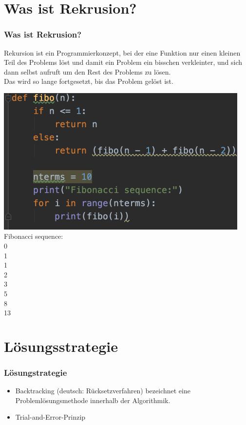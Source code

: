 \documentclass{beamer}
\begin{document}
\section{Was ist Rekrusion?}
\begin{frame}
	\frametitle{Was ist Rekrusion?} 
	\begin{minipage}{0.48\textwidth}
		Rekursion ist ein Programmierkonzept, bei der eine Funktion nur einen kleinen Teil des Problems löst und damit ein Problem ein bisschen verkleinter, und sich dann selbst aufruft um den Rest des Problems zu lösen.\\
		
		Das wird so lange fortgesetzt, bis das Problem gelöst ist.
		
	\end{minipage}
	\begin{minipage}{0.48\textwidth}
	\centering
	\includegraphics[width=0.95\textwidth]{img/fibo.png}
	\flushleft
	Fibonacci sequence:\\
	0\\
	1\\
	1\\
	2\\
	3\\
	5\\
	8\\
	13\\
	\end{minipage}
\end{frame}

\section{Lösungsstrategie}
\begin{frame}
	\frametitle{Lösungstrategie} 
	\begin{itemize}
		\item Backtracking (deutsch: Rücksetzverfahren) bezeichnet eine Problemlösungsmethode innerhalb der Algorithmik. 
		\item Trial-and-Error-Prinzip
	\end{itemize}
\end{frame}
\end{document}
